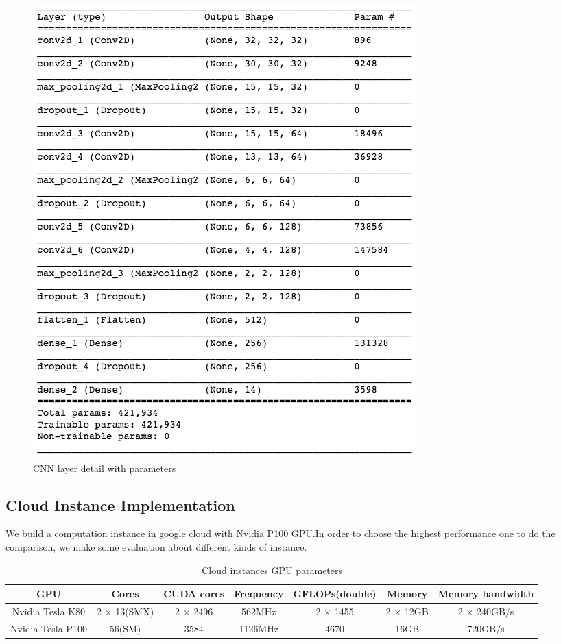 \documentclass[conference]{IEEEtran}
\begin{document}
\begin{figure}[hb]
\centering
  \begin{minipage}{.4\textwidth}
    \centering
    \includegraphics[width=0.8\linewidth]{archi_param.png}
    \caption{CNN layer detail with parameters}
    \label{fig:fig_1}
  \end{minipage}
\end{figure}


\subsection{Cloud Instance Implementation}

We build a computation instance in google cloud with Nvidia P100 GPU.In order to choose the highest performance one to do the comparison, we make some evaluation about different kinds of instance. 

\begin{table}
\caption{Cloud instances GPU parameters}
\centering
\begin{tabular}{|c|c|c|c|c|c|c|}
\hline
\textbf{GPU} & \textbf{Cores} & \textbf{CUDA cores} & \textbf{Frequency} & \textbf{GFLOPs(double)} & \textbf{Memory} & \textbf{Memory bandwidth}\\
\hline
Nvidia Tesla K80 & 2 $\times$ 13(SMX) & 2 $\times$ 2496 & 562MHz & 2 $\times$ 1455 & 2 $\times$ 12GB & 2 $\times$ 240GB/s \\
\hline
Nvidia Tesla P100 & 56(SM) & 3584 & 1126MHz & 4670 & 16GB & 720GB/s\\
\hline
\end{tabular}
\end{table}
\end{document}
